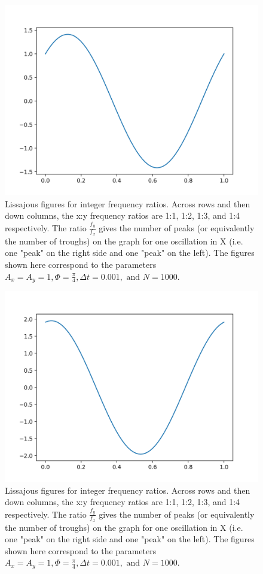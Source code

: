 \documentclass{article}
\begin{document}
\begin{figure}[H]
\includegraphics[width=\textwidth]{a1img1.png}
\caption{Lissajous figures for integer frequency ratios. Across rows and then down columns, the x:y frequency ratios are 1:1, 1:2, 1:3, and 1:4 respectively. The ratio $\frac{f_y}{f_x}$ gives the number of peaks (or equivalently the number of troughs) on the graph for one oscillation in X (i.e. one "peak" on the right side and one "peak" on the left). The figures shown here correspond to the parameters $A_x = A_y = 1, \Phi = \frac{\pi}{4}, \Delta t = 0.001,\text{ and }N = 1000.$}
\end{figure}
\begin{figure}[H]
\includegraphics[width=\textwidth]{a1img2.png}
\caption{Lissajous figures for integer frequency ratios. Across rows and then down columns, the x:y frequency ratios are 1:1, 1:2, 1:3, and 1:4 respectively. The ratio $\frac{f_y}{f_x}$ gives the number of peaks (or equivalently the number of troughs) on the graph for one oscillation in X (i.e. one "peak" on the right side and one "peak" on the left). The figures shown here correspond to the parameters $A_x = A_y = 1, \Phi = \frac{\pi}{4}, \Delta t = 0.001,\text{ and }N = 1000.$}
\end{figure}
\end{document}
